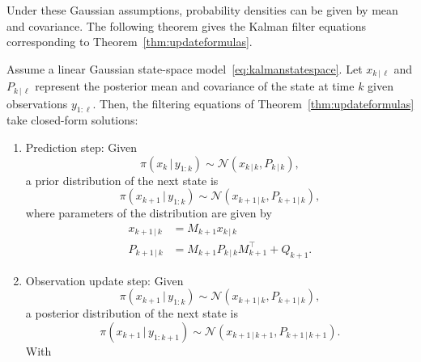 Under these Gaussian assumptions, probability densities can be given by mean and covariance.
The following theorem gives the Kalman filter equations corresponding to Theorem~\ref{thm:updateformulas}.
\begin{theorem}\label{thm:kalmanfilterupdate}
    Assume a linear Gaussian state-space model~\eqref{eq:kalmanstatespace}.
    Let $x_{k\,\vert\,\ell}$ and $P_{k\,\vert\,\ell}$ represent the posterior mean and covariance of the state at time $k$ given observations $y_{1:\ell}$.
    Then, the filtering equations of Theorem~\ref{thm:updateformulas} take closed-form solutions:
    \begin{enumerate}
        \item 
            Prediction step:
            Given
            \begin{equation*}
                \pi (x_k \, \vert \, y_{1:k}) \sim \mathcal{N}(x_{k\,\vert\,k}, P_{k\,\vert\,k}),
            \end{equation*}
            a prior distribution of the next state is
            \begin{equation*}
                \pi (x_{k+1} \, \vert \,  y_{1:k}) \sim \mathcal{N}(x_{k+1\,\vert\,k}, P_{k+1\,\vert\,k}),
            \end{equation*}
            where parameters of the distribution are given by
            \begin{subequations}\label{eq:kalmanpredictionstep}
                \begin{align}
                    x_{k+1\,\vert\,k} &= M_{k+1}x_{k\,\vert\,k}\\
                    P_{k+1\,\vert\,k} &= M_{k+1}P_{k\,\vert\,k}M_{k+1}^{\top} + Q_{k+1}.
                \end{align}
            \end{subequations}
        \item
            Observation update step:
            Given
            \begin{equation*}
                \pi (x_{k+1} \, \vert \,  y_{1:k}) \sim \mathcal{N}(x_{k+1\,\vert\,k}, P_{k+1\,\vert\,k}),
            \end{equation*}
            a posterior distribution of the next state is
            \begin{equation*}
                \pi (x_{k+1} \, \vert \,  y_{1:k+1}) \sim \mathcal{N}(x_{k+1\,\vert\,k+1}, P_{k+1\,\vert\,k+1}).
            \end{equation*}
            With 
            \begin{subequations}\label{eq:kalmanupdatestep}

\end{subequations}
\end{enumerate}
\end{theorem}
